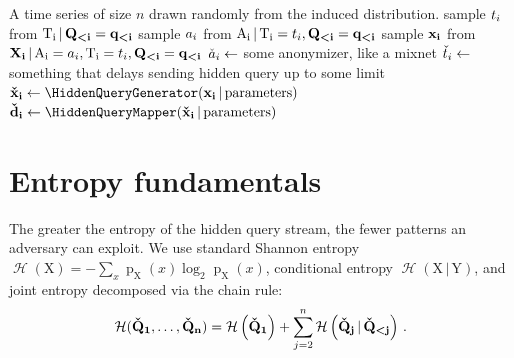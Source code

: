 \documentclass[final,11pt]{article}
\newcommand{\hrs}[1][]{%
   \ifthenelse{ \equal{#1}{} }
      {\ensuremath{\vec{\check{d}}}}
      {\ensuremath{\vec{\check{d}_{#1}}}}
}
\newcommand{\hqb}[1][]{%
   \ifthenelse{ \equal{#1}{} }
      {\ensuremath{\vec{\check{x}}}}
      {\ensuremath{\vec{\check{x}_{#1}}}}
}
\newcommand{\qb}[1][]{%
   \ifthenelse{ \equal{#1}{} }
      {\ensuremath{\vec{x}}}
      {\ensuremath{\vec{x_{#1}}}}
}
\newcommand{\rvqb}[1][]{%
   \ifthenelse{ \equal{#1}{} }
      {\ensuremath{\rv{\vec{X}}}}
      {\ensuremath{\rv{\vec{X_{#1}}}}}
}
\newcommand{\ts}[1][]{%
   \ifthenelse{ \equal{#1}{} }
      {\ensuremath{t}}
      {\ensuremath{t_{#1}}}
}
\newcommand{\rvts}[1][]{%
   \ifthenelse{ \equal{#1}{} }
      {\ensuremath{\rv{T}}}
      {\ensuremath{\rv{T_{#1}}}}
}
\newcommand{\hts}[1][]{%
   \ifthenelse{ \equal{#1}{} }
      {\ensuremath{\check{t}}}
      {\ensuremath{\check{t}_{#1}}}
}
\newcommand{\hsa}[1][]{%
   \ifthenelse{ \equal{#1}{} }
      {\ensuremath{\check{a}}}
      {\ensuremath{\check{a}_{#1}}}
}
\newcommand{\sa}[1][]{%
   \ifthenelse{ \equal{#1}{} }
      {\ensuremath{a}}
      {\ensuremath{a_{#1}}}
}
\newcommand{\rvsa}[1][]{%
   \ifthenelse{ \equal{#1}{} }
      {\ensuremath{\rv{A}}}
      {\ensuremath{\rv{A_{#1}}}}
}
\newcommand{\rvhtup}[1][]{%
   \ifthenelse{ \equal{#1}{} }
      {\ensuremath{\rv{\vec{\check{Q}}}}}
      {\ensuremath{\rv{\vec{\check{Q}_{#1}}}}}
}
\newcommand{\tup}[1][]{%
   \ifthenelse{ \equal{#1}{} }
      {\ensuremath{\vec{q}}}
      {\ensuremath{\vec{q_{#1}}}}
}
\newcommand{\rvtup}[1][]{%
   \ifthenelse{ \equal{#1}{} }
      {\ensuremath{\rv{\vec{Q}}}}
      {\ensuremath{\rv{\vec{Q_{#1}}}}}
}
\newcommand{\rv}[1]{\mathrm{#1}}
\newcommand{\entropy}{\operatorname{\mathcal{H}}}
\newcommand{\pmf}{\operatorname{p}}
\newcommand{\given}{{\,|\,}}
\renewcommand{\vec}[1]{\boldsymbol{\mathbf{#1}}}
\numberwithin{equation}{section}
\theoremstyle{plain}
\theoremstyle{remark}
\begin{document}
\begin{algorithm}[h]
    \caption{Generative model of a hidden query time series}
    \label{alg:gen_model}
    \parameters
    {
        
    }
    \KwIn
    {
        
    }
    \KwOut
    {
        A time series of size $n$ drawn randomly from the induced distribution.
    }
    {
        {
            sample $\ts[i]$ from $\rvts[i] \given \rvtup[<i] = \tup[<i]$\;
            sample $\sa[i]$ from $\rvsa[i] \given \rvts[i] = \ts[i], \rvtup[<i] = \tup[<i]$\;
            sample $\qb[i]$ from $\rvqb[i] \given \rvsa[i] = \sa[i], \rvts[i] = \ts[i], \rvtup[<i] = \tup[<i]$\;
            $\hsa[i] \gets$ some anonymizer, like a mixnet\;
            $\hts[i] \gets$ something that delays sending hidden query up to some limit\;
            $\hqb[i] \gets \HiddenQueryGenerator(\qb[i] \given \textrm{parameters})$\;
            $\hrs[i] \gets \HiddenQueryMapper(\hqb[i] \given \textrm{parameters})$\;
        }
    }
\end{algorithm}

\section{Entropy fundamentals}
\label{sec:entropy_fundamentals}
The greater the entropy of the hidden query stream, the fewer patterns an adversary can exploit. We use standard Shannon entropy $\entropy(\rv{X}) = -\sum_x \pmf_{\rv{X}}(x) \log_2 \pmf_{\rv{X}}(x)$, conditional entropy $\entropy(\rv{X} \given \rv{Y})$, and joint entropy decomposed via the chain rule:
\begin{equation}
\label{eq:jointentropy}
    \entropy(\rvhtup[1], \ldots, \rvhtup[n]) =
        \entropy\left(\rvhtup[1]\right) +
        \sum_{j=2}^{n} \entropy\left(\rvhtup[j] \given \rvhtup[<j]\right)\,.
\end{equation}
\end{document}
